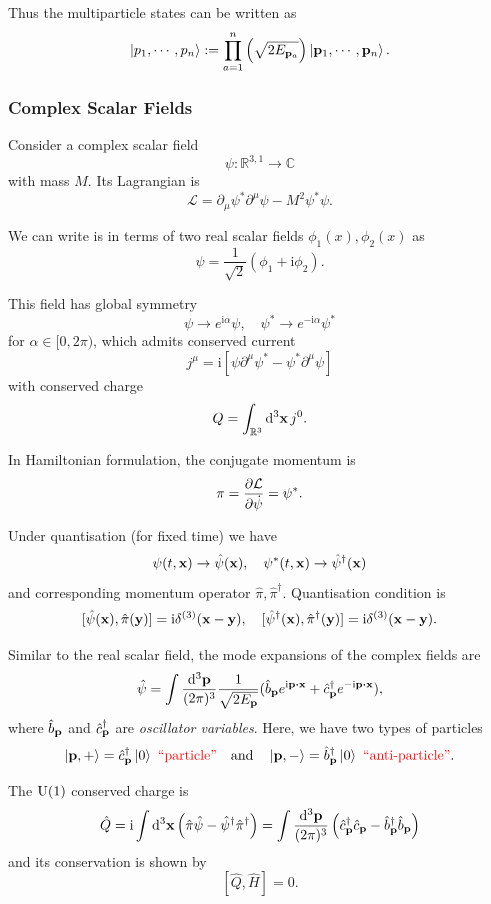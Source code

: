 \documentclass[a4paper,11pt]{article}
\begin{document}
	Thus the multiparticle states can be written as 
	\[
		\ket{p_1, \cdots, p_n} := \prod _{a = 1}^n \left( \sqrt{2 E _{\vb p_a}} \right) \ket{\vb p_1, \cdots, \vb p_n}.
	\]

	\subsubsection{Complex Scalar Fields}

	Consider a complex scalar field
	\[
		\psi : \mathbb{R}^{3,1} \to \mathbb{C}
	\]
	with mass $M$. Its Lagrangian is
	\[
		\mathcal{L} = \partial_\mu \psi^* \partial^\mu \psi - M^2 \psi^* \psi.
	\]
	
	We can write is in terms of two real scalar fields $\phi_1(x), \phi_2(x)$ as 
	\[
		\psi = \frac{1}{\sqrt{2}} (\phi_1 + \mathrm{i} \phi_2).
	\]
	
	This field has global symmetry
	\[
		\psi \to e ^{\mathrm{i} \alpha} \psi, \quad \psi^* \to e ^{- \mathrm{i} \alpha} \psi^*
	\]
	for $\alpha \in [0,2 \pi)$, which admits conserved current
	\[
		j^\mu = \mathrm{i}\left[ \psi \partial^\mu \psi^* - \psi^* \partial^\mu \psi \right]
	\]
	with conserved charge
	\[
		Q = \int _{\mathbb{R}^3} \dd[3]{\vb x} j^0.
	\]
	
	In Hamiltonian formulation, the conjugate momentum is
	\[
		\pi = \pdv{\mathcal{L}}{\dot \psi} = \psi^*.
	\]
	
	Under quantisation (for fixed time) we have
	\[
		\psi(t, \vb x) \to \hat \psi(\vb x), \quad \psi^* (t, \vb x) \to \hat \psi^\dagger (\vb x)
	\]
	and corresponding momentum operator $\hat \pi, \hat \pi^{\dagger}$. Quantisation condition is
	\[
		[\hat \psi(\vb x), \hat \pi(\vb y)] = \mathrm{i} \delta ^{(3)}(\vb x - \vb y), \quad [\hat \psi^{\dagger}(\vb x), \hat \pi^{\dagger}(\vb y)] = \mathrm{i} \delta^{(3)} (\vb x - \vb y).
	\]

	Similar to the real scalar field, the mode expansions of the complex fields are
	\[
		\hat \psi = \int \ddk{\vb p}{3} \frac{1}{\sqrt{2E _{\vb p}}} (\hat b _{\vb p} e ^{\mathrm{i} \vb p \vdot \vb x} + \hat c^{\dagger}_{\vb p} e ^{-\mathrm{i} \vb p \vdot \vb x}),
	\]
	where $\hat b _{\vb p}$ and $\hat c^{\dagger}_{\vb p}$ are \emph{oscillator variables}. Here, we have two types of particles
	\[
		\ket{\vb p, +} = \hat c^{\dagger}_{\vb p} \ket{0} \text{{\color{red}\ ``particle''}}\quad \text{and} \quad \ket{\vb p, -} = \hat b^{\dagger} _{\vb p} \ket{0}\text{{\color{red}\ ``anti-particle''}}.
	\]
	
	The $\operatorname{U}(1)$ conserved charge is
	\[
		\hat Q = \mathrm{i} \int \dd[3]{\vb x} \left(\hat \pi \hat \psi - \hat \psi^{\dagger} \hat \pi^{\dagger}\right) = \int \frac{\dd[3]{\vb p}}{(2\pi)^{3}} \left( \hat c^{\dagger}_{\vb p}\hat c _{\vb p} - \hat b^{\dagger}_{\vb p} \hat b _{\vb p} \right)
	\]
	and its conservation is shown by
	\[
		[\hat Q, \hat H] = 0.
	\]
	
\end{document}
